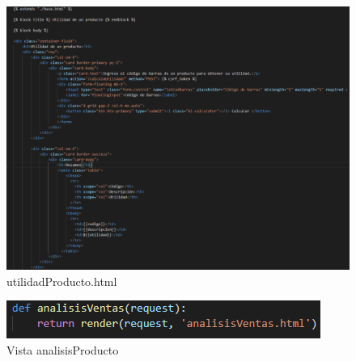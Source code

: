 \documentclass[12pt,letterpaper]{article}
\begin{document}
	\begin{figure}[H]
		\centering
		\includegraphics[scale=0.70]{Documentacion/img/lineasUtilidad.png}
		\caption{utilidadProducto.html}
	\end{figure}
	
	\begin{figure}[H]
		\centering
		\includegraphics[scale=0.70]{Documentacion/img/def_analisis.png}
		\caption{Vista analisisProducto}
	\end{figure}
	
\end{document}
